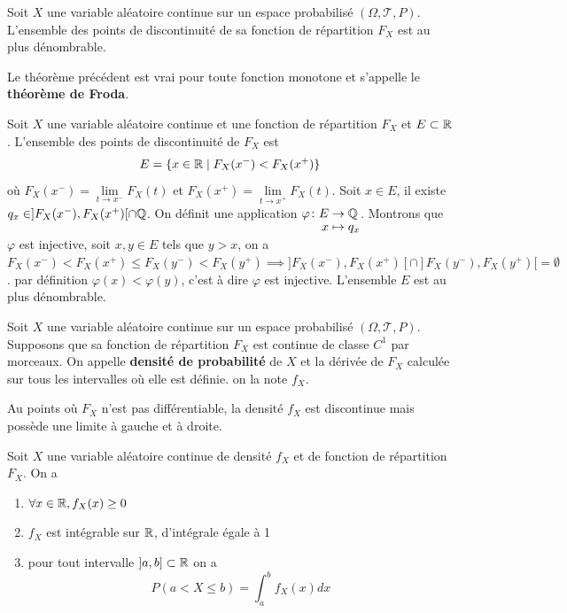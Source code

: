 \documentclass[a4paper, 12pt]{article}
\begin{document}
\begin{theoreme}{}{}
    Soit $X$ une variable aléatoire continue sur un espace probabilisé $(\Omega, \mathcal{T}, P)$.
    L'ensemble des points de discontinuité de sa fonction de répartition $F_X$ est au plus dénombrable.
\end{theoreme}

\begin{remarque}
    Le théorème précédent est vrai pour toute fonction monotone et s'appelle le \textbf{théorème de Froda}.
\end{remarque}

\begin{demonstration}
    Soit $X$ une variable aléatoire continue et une fonction de répartition $F_X$ et $E \subset \mathbb{R}$.
    L'ensemble des points de discontinuité de $F_X$ est
    $$
    E = \{x \in \mathbb{R} \mid F_X(x^-) < F_X(x^+)\}
    $$
    où $F_X(x^-) = \lim\limits_{t \to x^-} F_X(t)$ et $F_X(x^+) = \lim\limits_{t \to x^+} F_X(t)$.
    Soit $x \in E$, il existe $q_x \in ]F_X(x^-), F_X(x^+)[ \cap \mathbb{Q}$.
    On définit une application $\funcdef{\varphi}{E}{\Q}{x}{q_x}$.
    Montrons que $\varphi$ est injective, soit $x, y \in E$ tels que $y > x$, on a $F_X(x^-) < F_X(x^+) \leq F_X(y^-) < F_X(y^+) \implies ]F_X(x^-), F_X(x^+)[\cap]F_X(y^-), F_X(y^+)[ = \emptyset$.
    par définition $\varphi(x) < \varphi(y)$, c'est à dire $\varphi$ est injective. L'ensemble $E$ est au plus dénombrable.
\end{demonstration}

\begin{definition}
    Soit $X$ une variable aléatoire continue sur un espace probabilisé $(\Omega, \mathcal{T}, P)$.
    Supposons que sa fonction de répartition $F_X$ est continue de classe $C^1$ par morceaux.
    On appelle \textbf{densité de probabilité} de $X$ et la dérivée de $F_X$ calculée sur tous les intervalles
    où elle est définie. on la note $f_X$.
\end{definition}

\begin{remarque}
    Au points où $F_X$ n'est pas différentiable, la densité $f_X$ est discontinue mais possède une limite à gauche et à droite.
\end{remarque}

\begin{proposition}{}{}
    Soit $X$ une variable aléatoire continue de densité $f_X$ et de fonction de répartition $F_X$. On a
    \begin{enumerate}
        \item $\forall x \in \mathbb{R}, f_X(x) \geq 0$
        \item $f_X$ est intégrable sur $\mathbb{R}$, d'intégrale égale à 1
        \item pour tout intervalle $]a, b] \subset \mathbb{R}$ on a
        $$
        P(a < X \leq b) = \int_a^b f_X(x)dx
        $$
    \end{enumerate}
\end{proposition}
\end{document}
